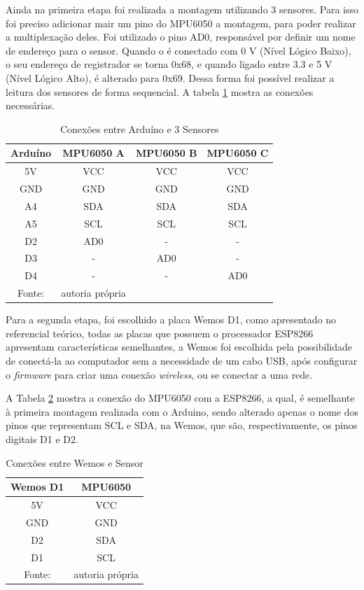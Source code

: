		Ainda na primeira etapa foi realizada a montagem utilizando 3 sensores.  Para isso foi preciso adicionar mair um pino do MPU6050 a montagem, para poder realizar a multiplexação deles. Foi utilizado o pino AD0, responsável por definir um nome de endereço para o sensor. Quando o é conectado com 0 V (Nível Lógico Baixo), o seu endereço de registrador se torna 0x68, e quando ligado entre 3.3 e 5 V (Nível Lógico Alto), é alterado para 0x69.  Dessa forma foi possível realizar a leitura dos sensores de forma sequencial. A tabela \ref{conexoes_mult} mostra as conexões necessárias.
		
		 	\begin{table}[h] \footnotesize
		 	\centering
		 	\caption{Conexões entre Arduíno e 3 Sensores }
		 	\label{conexoes_mult}
		 	
		 	\begin{tabular}{cccc}
		 		\toprule
		 		\textbf{Arduíno} & \textbf{MPU6050 A} & \textbf{MPU6050 B} & \textbf{MPU6050 C} \\
		 		\midrule
		 		5V & VCC & VCC & VCC  \\
		 		GND & GND & GND & GND\\
		 		A4 & SDA & SDA & SDA  \\
		 		A5 & SCL & SCL & SCL \\
		 		D2 & AD0 & - & - \\
		 		D3 & - & AD0 & - \\
		 		D4 & - & - & AD0 \\
		 		\bottomrule
		 		Fonte: & autoria própria
		 	\end{tabular}
		 \end{table}
	 
	 Para a segunda etapa, foi escolhido a placa Wemos D1,  como apresentado no referencial teórico, todas as placas que possuem o processador ESP8266 apresentam características  semelhantes, a Wemos foi escolhida pela possibilidade de conectá-la ao computador sem a necessidade de um cabo USB, após configurar o \textit{firmware} para criar uma conexão \textit{wireless}, ou se conectar a uma rede. 
	 
	 A Tabela \ref{conexoes_esp} mostra a conexão do MPU6050 com a ESP8266, a qual,  é semelhante à primeira montagem realizada com o Arduino, sendo alterado apenas o nome dos pinos que representam SCL e SDA, na Wemos, que são, respectivamente, os pinos digitais D1 e D2.
	  
	 \begin{table}[h] \footnotesize
	 	\centering
	 	\caption{Conexões entre Wemos e Sensor  }
	 	\label{conexoes_esp}
	 	
	 	\begin{tabular}{cc}
	 		\toprule
	 		\textbf{Wemos D1} & \textbf{MPU6050} \\
	 		\midrule
	 		5V & VCC \\
	 		GND & GND \\
	 		D2  & SDA  \\
	 		D1 & SCL \\
	 		\bottomrule
	 		Fonte: & autoria própria
	 	\end{tabular}
	 \end{table}
 
